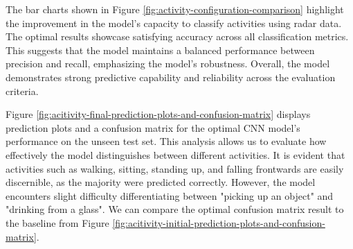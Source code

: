 \documentclass{l4proj}
\begin{document}
The bar charts shown in Figure \ref{fig:activity-configuration-comparison} highlight the improvement in the model’s capacity to classify activities using radar data. The optimal results showcase satisfying accuracy across all classification metrics. This suggests that the model maintains a balanced performance between precision and recall, emphasizing the model’s robustness. Overall, the model demonstrates strong predictive capability and reliability across the evaluation criteria. 

Figure \ref{fig:acitivity-final-prediction-plots-and-confusion-matrix} displays prediction plots and a confusion matrix for the optimal CNN model’s performance on the unseen test set. This analysis allows us to evaluate how effectively the model distinguishes between different activities. It is evident that activities such as walking, sitting, standing up, and falling frontwards are easily discernible, as the majority were predicted correctly. However, the model encounters slight difficulty differentiating between "picking up an object" and "drinking from a glass". We can compare the optimal confusion matrix result to the baseline from Figure \ref{fig:acitivity-initial-prediction-plots-and-confusion-matrix}.
\end{document}
